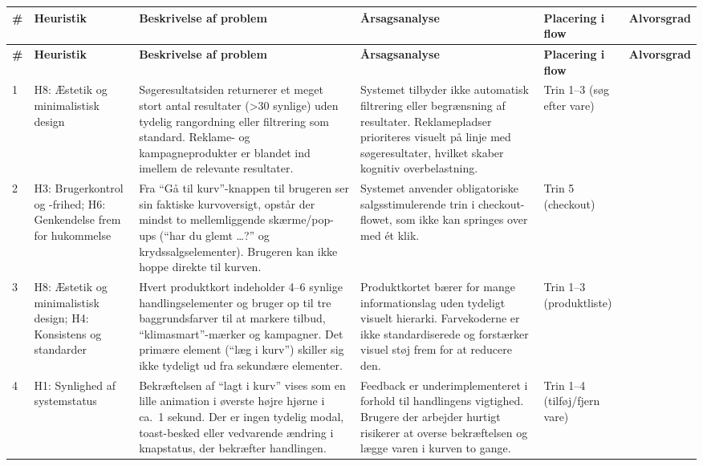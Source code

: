 \documentclass[12pt,a4paper]{article}
\begin{document}
\vspace{1em}
\begin{longtable}{>{\raggedright\arraybackslash}p{0.5cm}
                  >{\raggedright\arraybackslash}p{2.5cm}
                  >{\raggedright\arraybackslash}p{3.5cm}
                  >{\raggedright\arraybackslash}p{3.5cm}
                  >{\raggedright\arraybackslash}p{1.8cm}
                  >{\centering\arraybackslash}p{0.9cm}}
\toprule
\textbf{\#} & \textbf{Heuristik} & \textbf{Beskrivelse af problem} &
\textbf{Årsagsanalyse} & \textbf{Placering i flow} & \textbf{Alvorsgrad} \\
\midrule
\endfirsthead
\toprule
\textbf{\#} & \textbf{Heuristik} & \textbf{Beskrivelse af problem} &
\textbf{Årsagsanalyse} & \textbf{Placering i flow} & \textbf{Alvorsgrad} \\
\midrule
\endhead
\bottomrule
\endfoot

1 &
H8: Æstetik og minimalistisk design &
Søgeresultatsiden returnerer et meget stort antal resultater (>30 synlige) uden tydelig
rangordning eller filtrering som standard. Reklame- og kampagneprodukter er blandet ind
imellem de relevante resultater. &
Systemet tilbyder ikke automatisk filtrering eller begrænsning af resultater. Reklamepladser
prioriteres visuelt på linje med søgeresultater, hvilket skaber kognitiv overbelastning. &
Trin 1--3 (søg efter vare) &
3 \\
\midrule

2 &
H3: Brugerkontrol og -frihed; H6: Genkendelse frem for hukommelse &
Fra ``Gå til kurv''-knappen til brugeren ser sin faktiske kurvoversigt, opstår der mindst
to mellemliggende skærme/pop-ups (``har du glemt \ldots?'' og krydssalgselementer). Brugeren
kan ikke hoppe direkte til kurven. &
Systemet anvender obligatoriske salgsstimulerende trin i checkout-flowet, som ikke kan
springes over med ét klik. &
Trin 5 (checkout) &
2 \\
\midrule

3 &
H8: Æstetik og minimalistisk design; H4: Konsistens og standarder &
Hvert produktkort indeholder 4--6 synlige handlingselementer og bruger op til tre
baggrundsfarver til at markere tilbud, ``klimasmart''-mærker og kampagner. Det primære
element (``læg i kurv'') skiller sig ikke tydeligt ud fra sekundære elementer. &
Produktkortet bærer for mange informationslag uden tydeligt visuelt hierarki. Farvekoderne
er ikke standardiserede og forstærker visuel støj frem for at reducere den. &
Trin 1--3 (produktliste) &
3 \\
\midrule

4 &
H1: Synlighed af systemstatus &
Bekræftelsen af ``lagt i kurv'' vises som en lille animation i øverste højre hjørne i
ca.\ 1 sekund. Der er ingen tydelig modal, toast-besked eller vedvarende ændring i
knapstatus, der bekræfter handlingen. &
Feedback er underimplementeret i forhold til handlingens vigtighed. Brugere der arbejder
hurtigt risikerer at overse bekræftelsen og lægge varen i kurven to gange. &
Trin 1--4 (tilføj/fjern vare) &
2 \\

\bottomrule
\end{longtable}
\end{document}
